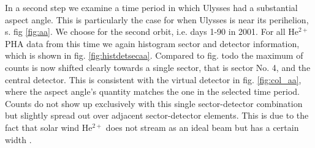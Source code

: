 In a second step we examine a time period in which Ulysses had a substantial aspect angle. This is particularly the case for when Ulysses is near its perihelion, s. fig \ref{fig:aa}. We choose for the second orbit, i.e. days 1-90 in 2001. For all $\mathrm{He^{2+}}$ PHA data from this time we again histogram sector and detector information, which is shown in fig. \ref{fig:histdetsecaa}. Compared to fig. todo the maximum of counts is now shifted clearly towards a single sector, that is sector No. 4, and the central detector. This is consistent with the virtual detector in fig. \ref{fig:col_aa}, where the aspect angle's quantity matches the one in the selected time period. Counts do not show up exclusively with this single sector-detector combination but slightly spread out over adjacent sector-detector elements. This is due to the fact that solar wind $\mathrm{He^{2+}}$ does not stream as an ideal beam but has a certain width \citep[][,ch. 6.1]{prlss_2004}.


